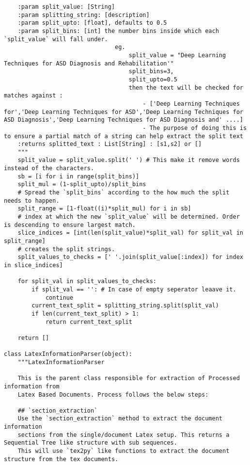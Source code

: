 \begin{lstlisting}
    :param split_value: [String]
    :param splitting_string: [description]
    :param split_upto: [float], defaults to 0.5 
    :param split_bins: [int] the number bins inside which each `split_value` will fall under. 
                                eg. 
                                    split_value = "Deep Learning Techniques for ASD Diagnosis and Rehabilitation'"
                                    split_bins=3,
                                    split_upto=0.5
                                    then the text will be checked for matches against : 
                                        - ['Deep Learning Techniques for','Deep Learning Techniques for ASD','Deep Learning Techniques for ASD Diagnosis','Deep Learning Techniques for ASD Diagnosis and' ....]
                                        - The purpose of doing this is to ensure a partial match of a string can help extract the split text 
    :returns splitted_text : List[String] : [s1,s2] or []
    """
    split_value = split_value.split(' ') # This make it remove words instead of the characters. 
    sb = [i for i in range(split_bins)]
    split_mul = (1-split_upto)/split_bins
    # Spread the `split_bins` according to the how much the split needs to happen. 
    split_range = [1-float((i)*split_mul) for i in sb]
    # index at which the new `split_value` will be determined. Order is descending to ensure largest match. 
    slice_indices = [int(len(split_value)*split_val) for split_val in split_range] 
    # creates the split strings.     
    split_values_to_checks = [' '.join(split_value[:index]) for index in slice_indices] 
    
    for split_val in split_values_to_checks:
        if split_val == '': # In case of empty seperator leaave it. 
            continue
        current_text_split = splitting_string.split(split_val)
        if len(current_text_split) > 1:
            return current_text_split
    
    return []

class LatexInformationParser(object):
    """LatexInformationParser 

    This is the parent class responsible for extraction of Processed information from 
    Latex Based Documents. Process follows the below steps:

    ## `section_extraction`
    Use the `section_extraction` method to extract the document information
    sections from the single/document Latex setup. This returns a Sequential Tree like structure with sub sequences. 
    This will use `tex2py` like functions to extract the document structure from the tex documents. 
    

\end{lstlisting}
